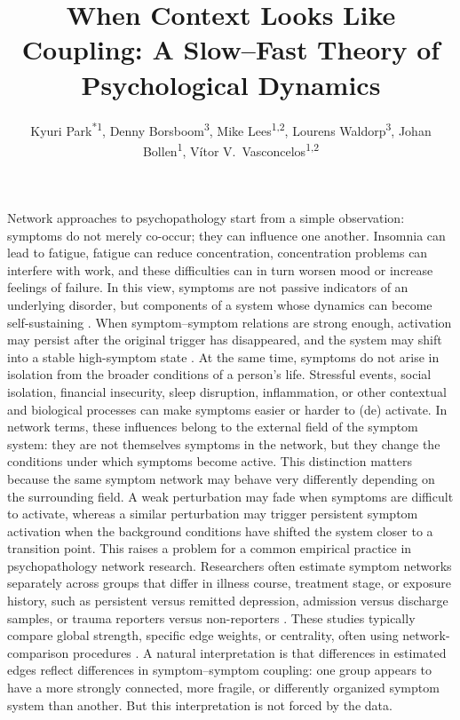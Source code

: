 \documentclass[man,12pt,floatsintext]{apa7}
\title{When Context Looks Like Coupling: A Slow--Fast Theory of Psychological Dynamics}
\author{%
Kyuri Park\textsuperscript{*1},
Denny Borsboom\textsuperscript{3},
Mike Lees\textsuperscript{1,2},
Lourens Waldorp\textsuperscript{3},
Johan Bollen\textsuperscript{1},
Vítor V.\ Vasconcelos\textsuperscript{1,2}
}
\affiliation{%
\textsuperscript{1} University of Amsterdam\mbox{,} Informatics Institute\mbox{,} Computational Science Lab\\
\textsuperscript{2} University of Amsterdam\mbox{,} Institute for Advanced Study\\
\textsuperscript{3} University of Amsterdam\mbox{,} Department of Psychology
}
\begin{document}
\maketitle %
Network approaches to psychopathology start from a simple observation: symptoms do not merely co-occur; they can influence one another. Insomnia can lead to fatigue, fatigue can reduce concentration, concentration problems can interfere with work, and these difficulties can in turn worsen mood or increase feelings of failure. In this view, symptoms are not passive indicators of an underlying disorder, but components of a system whose dynamics can become self-sustaining \parencite{borsboom2017network, robinaugh2020network}. When symptom--symptom relations are strong enough, activation may persist after the original trigger has disappeared, and the system may shift into a stable high-symptom state \parencite{van2014critical}.
At the same time, symptoms do not arise in isolation from the broader conditions of a person's life. Stressful events, social isolation, financial insecurity, sleep disruption, inflammation, or other contextual and biological processes can make symptoms easier or harder to (de) activate. In network terms, these influences belong to the external field of the symptom system: they are not themselves symptoms in the network, but they change the conditions under which symptoms become active. This distinction matters because the same symptom network may behave very differently depending on the surrounding field. A weak perturbation may fade when symptoms are difficult to activate, whereas a similar perturbation may trigger persistent symptom activation when the background conditions have shifted the system closer to a transition point.
This raises a problem for a common empirical practice in psychopathology network research. Researchers often estimate symptom networks separately across groups that differ in illness course, treatment stage, or exposure history, such as persistent versus remitted depression, admission versus discharge samples, or trauma reporters versus non-reporters \parencite[e.g.,][]{van2015association, beard2016network, peel2021comparison}. These studies typically compare global strength, specific edge weights, or centrality, often using network-comparison procedures \parencite{van2023comparing, haslbeck2022estimating}. A natural interpretation is that differences in estimated edges reflect differences in symptom--symptom coupling: one group appears to have a more strongly connected, more fragile, or differently organized symptom system than another. But this interpretation is not forced by the data.
\end{document}
